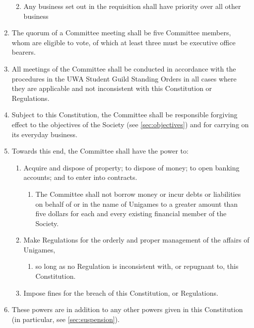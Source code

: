 \documentclass[a4paper]{article}
\begin{document}
\begin{enumerate}
\begin{enumerate}
\begin{enumerate}
                    \end{enumerate}
              \item Any business set out in the requisition shall have priority over all other business
          \end{enumerate}
    \item The quorum of a Committee meeting shall be five Committee members, whom are eligible to vote, of which at least three must be executive office bearers.
    \item All meetings of the Committee shall be conducted in accordance with the procedures in the UWA Student Guild Standing Orders in all cases where they are applicable and not inconsistent with this Constitution or Regulations.
    \item Subject to this Constitution, the Committee shall be responsible forgiving effect to the objectives of the Society (see \cref{sec:objectives}) and for carrying on its everyday business.
    \item Towards this end, the Committee shall have the power to:
          \begin{enumerate}
              \item Acquire and dispose of property; to dispose of money; to open banking accounts; and to enter into contracts.
                    \begin{enumerate}
                        \item The Committee shall not borrow money or incur debts or liabilities on behalf of or in the name of Unigames to a greater amount than five dollars for each and every existing financial member of the Society.
                    \end{enumerate}
              \item Make Regulations for the orderly and proper management of the affairs of Unigames,
                    \begin{enumerate}
                        \item so long as no Regulation is inconsistent with, or repugnant to, this Constitution.
                    \end{enumerate}
              \item Impose fines for the breach of this Constitution, or Regulations.
          \end{enumerate}
    \item These powers are in addition to any other powers given in this Constitution (in particular, see \cref{sec:suspension}).
\end{enumerate}
\end{document}
